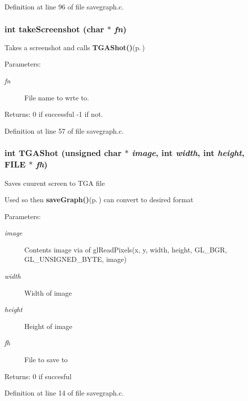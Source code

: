 Definition at line 96 of file savegraph.c.
\subsubsection{\setlength{\rightskip}{0pt plus 5cm}int take\-Screenshot (char $\ast$ {\em fn})}\label{savegraph_8h_a1}


Takes a screenshot and calls {\bf TGAShot()}{\rm (p.\,\pageref{screenshot_8h_a6})}

\begin{Desc}
\item[Parameters:]
\begin{description}
\item[{\em fn}]File name to wrte to. \end{description}
\end{Desc}
\begin{Desc}
\item[Returns:]0 if successful -1 if not. \end{Desc}


Definition at line 57 of file savegraph.c.
\subsubsection{\setlength{\rightskip}{0pt plus 5cm}int TGAShot (unsigned char $\ast$ {\em image}, int {\em width}, int {\em height}, FILE $\ast$ {\em fh})}\label{savegraph_8h_a0}


Saves cuurent screen to TGA file

Used so then {\bf save\-Graph()}{\rm (p.\,\pageref{savegraph_8h_a2})} can convert to desired format \begin{Desc}
\item[Parameters:]
\begin{description}
\item[{\em image}]Contents image via of gl\-Read\-Pixels(x, y, width, height, GL\_\-BGR, GL\_\-UNSIGNED\_\-BYTE, image) \item[{\em width}]Width of image \item[{\em height}]Height of image \item[{\em fh}]File to save to \end{description}
\end{Desc}
\begin{Desc}
\item[Returns:]0 if succesful \end{Desc}


Definition at line 14 of file savegraph.c.